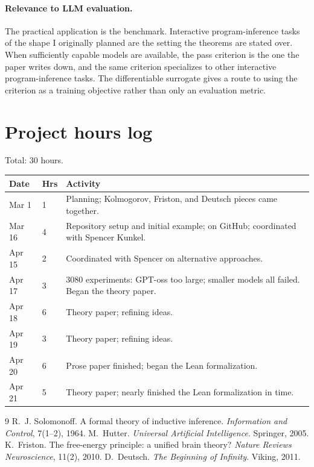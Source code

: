 \documentclass[11pt]{article}
\begin{document}
\paragraph{Relevance to LLM evaluation.} The practical application is the benchmark. Interactive program-inference tasks of the shape I originally planned are the setting the theorems are stated over. When sufficiently capable models are available, the pass criterion is the one the paper writes down, and the same criterion specializes to other interactive program-inference tasks. The differentiable surrogate gives a route to using the criterion as a training objective rather than only an evaluation metric.

\section{Project hours log}

Total: 30 hours.

\begin{center}\small
\begin{tabular}{llp{4.6in}}
\toprule
Date & Hrs & Activity \\
\midrule
Mar 1   & 1 & Planning; Kolmogorov, Friston, and Deutsch pieces came together. \\
Mar 16  & 4 & Repository setup and initial example; on GitHub; coordinated with Spencer Kunkel. \\
Apr 15  & 2 & Coordinated with Spencer on alternative approaches. \\
Apr 17  & 3 & 3080 experiments: GPT-oss too large; smaller models all failed. Began the theory paper. \\
Apr 18  & 6 & Theory paper; refining ideas. \\
Apr 19  & 3 & Theory paper; refining ideas. \\
Apr 20  & 6 & Prose paper finished; began the Lean formalization. \\
Apr 21  & 5 & Theory paper; nearly finished the Lean formalization in time. \\
\bottomrule
\end{tabular}
\end{center}

\begin{thebibliography}{9}
\footnotesize
{} R.~J. Solomonoff. A formal theory of inductive inference. \emph{Information and Control}, 7(1--2), 1964.
 M.~Hutter. \emph{Universal Artificial Intelligence}. Springer, 2005.
 K.~Friston. The free-energy principle: a unified brain theory? \emph{Nature Reviews Neuroscience}, 11(2), 2010.
 D.~Deutsch. \emph{The Beginning of Infinity}. Viking, 2011.
\end{thebibliography}
\end{document}
